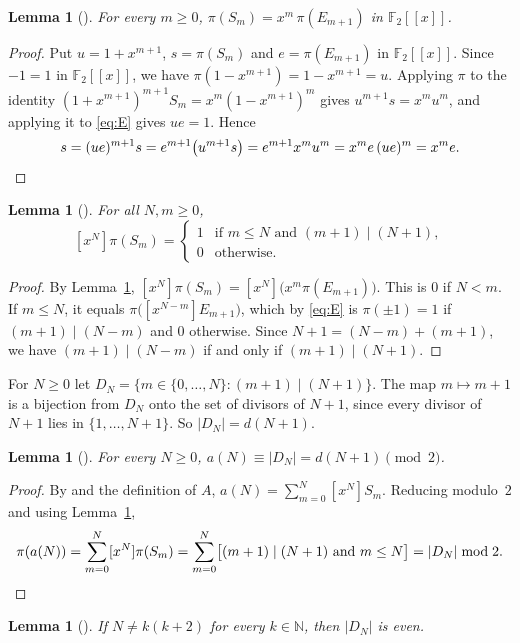 \documentclass[11pt]{amsart}
\theoremstyle{plain}
\newtheorem{lemma}[theorem]{Lemma}
\theoremstyle{definition}
\newcommand{\N}{\mathbb{N}}
\newcommand{\F}{\mathbb{F}_2}
\newcommand{\coef}[1]{[x^{#1}]}
\begin{document}
\begin{lemma}[]\label{lem:map}
For every $m\ge0$, $\pi(S_m)=x^m\,\pi(E_{m+1})$ in $\F[[x]]$.
\end{lemma}

\begin{proof}
Put $u=1+x^{m+1}$, $s=\pi(S_m)$ and $e=\pi(E_{m+1})$ in $\F[[x]]$. Since $-1=1$ in $\F[[x]]$, we have $\pi(1-x^{m+1})=1-x^{m+1}=u$. Applying $\pi$ to the identity $(1+x^{m+1})^{m+1}S_m=x^m(1-x^{m+1})^m$ gives $u^{m+1}s=x^mu^m$, and applying it to \eqref{eq:E} gives $ue=1$. Hence
\[
  s=(ue)^{m+1}s=e^{m+1}\bigl(u^{m+1}s\bigr)=e^{m+1}x^mu^m=x^m e\,(ue)^m=x^me.\qedhere
\]
\end{proof}

\begin{lemma}[]\label{lem:coeff}
For all $N,m\ge0$,
\[
  \coef{N}\pi(S_m)=\begin{cases}1&\text{if }m\le N\text{ and }(m+1)\mid(N+1),\\0&\text{otherwise.}\end{cases}
\]
\end{lemma}

\begin{proof}
By Lemma~\ref{lem:map}, $\coef{N}\pi(S_m)=\coef{N}\bigl(x^m\pi(E_{m+1})\bigr)$. This is $0$ if $N<m$. If $m\le N$, it equals $\pi\bigl(\coef{N-m}E_{m+1}\bigr)$, which by \eqref{eq:E} is $\pi(\pm1)=1$ if $(m+1)\mid(N-m)$ and $0$ otherwise. Since $N+1=(N-m)+(m+1)$, we have $(m+1)\mid(N-m)$ if and only if $(m+1)\mid(N+1)$.
\end{proof}

For $N\ge0$ let $D_N=\{m\in\{0,\dots,N\}:(m+1)\mid(N+1)\}$. The map $m\mapsto m+1$ is a bijection from $D_N$ onto the set of divisors of $N+1$, since every divisor of $N+1$ lies in $\{1,\dots,N+1\}$. So $|D_N|=d(N+1)$.

\begin{lemma}[]\label{lem:cast}
For every $N\ge0$, $a(N)\equiv|D_N|=d(N+1)\pmod2$.
\end{lemma}

\begin{proof}
By  and the definition of $A$, $a(N)=\sum_{m=0}^{N}\coef{N}S_m$. Reducing modulo~$2$ and using Lemma~\ref{lem:coeff},
\[
  \pi(a(N))=\sum_{m=0}^{N}\coef{N}\pi(S_m)=\sum_{m=0}^{N}\bigl[(m+1)\mid(N+1)\text{ and }m\le N\bigr]=|D_N|\bmod 2.\qedhere
\]
\end{proof}

\begin{lemma}[]\label{lem:even}
If $N\ne k(k+2)$ for every $k\in\N$, then $|D_N|$ is even.
\end{lemma}
\end{document}
